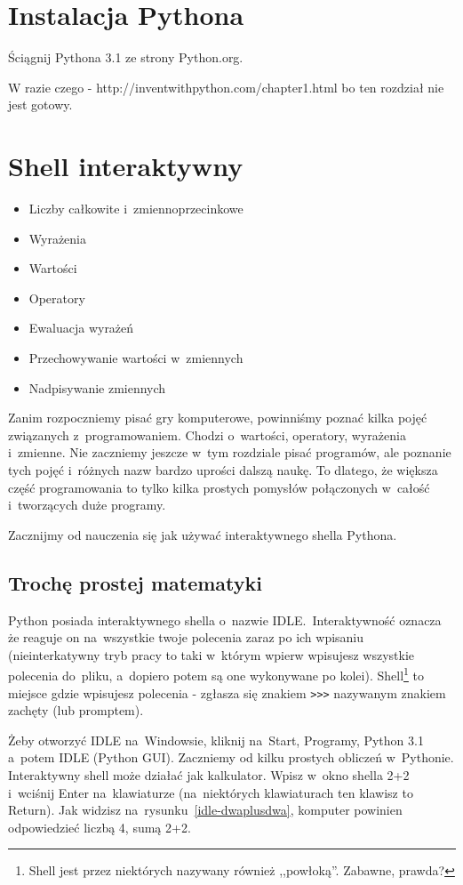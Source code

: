 \documentclass{book}
\newcommand{\btopicscovered}{
	\begin{graybox}
	\begin{itemize}
}
\newcommand{\etopicscovered}{
	\end{itemize}
	\end{graybox}
}
\begin{document}
\chapter{Instalacja Pythona}

Ściągnij Pythona 3.1 ze strony Python.org.

W razie czego - http://inventwithpython.com/chapter1.html bo ten rozdział nie jest gotowy.

\chapter{Shell interaktywny}
\btopicscovered
	\item Liczby całkowite i~zmiennoprzecinkowe
	\item Wyrażenia
	\item Wartości
	\item Operatory
	\item Ewaluacja wyrażeń
	\item Przechowywanie wartości w~zmiennych
	\item Nadpisywanie zmiennych
\etopicscovered

Zanim rozpoczniemy pisać gry komputerowe, powinniśmy poznać kilka pojęć związanych z~programowaniem. Chodzi o~wartości, operatory, wyrażenia i~zmienne. Nie zaczniemy jeszcze w~tym rozdziale pisać programów, ale poznanie tych pojęć i~różnych nazw bardzo uprości dalszą naukę. To dlatego, że większa część programowania to tylko kilka prostych pomysłów połączonych w~całość i~tworzących duże programy.

Zacznijmy od nauczenia się jak używać interaktywnego shella Pythona.

\section{Trochę prostej matematyki}

Python posiada interaktywnego shella o~nazwie IDLE.~Interaktywność oznacza że reaguje on na~wszystkie twoje polecenia zaraz po ich wpisaniu (nieinterkatywny tryb pracy to taki w~którym wpierw wpisujesz wszystkie polecenia do~pliku, a~dopiero potem są one wykonywane po kolei). Shell\footnote{Shell jest przez niektórych nazywany również ,,powłoką''. Zabawne, prawda?} to miejsce gdzie wpisujesz polecenia - zgłasza się znakiem \lstinline{>>>} nazywanym znakiem zachęty (lub promptem).

Żeby otworzyć IDLE na~Windowsie, kliknij na~Start, Programy, Python 3.1 a~potem IDLE (Python GUI). Zaczniemy od kilku prostych obliczeń w~Pythonie. Interaktywny shell może działać jak kalkulator. Wpisz w~okno shella 2+2 i~wciśnij Enter na~klawiaturze (na~niektórych klawiaturach ten klawisz to Return). Jak widzisz na~rysunku~\ref{idle-dwaplusdwa}, komputer powinien odpowiedzieć liczbą 4, sumą 2+2.
\end{document}
